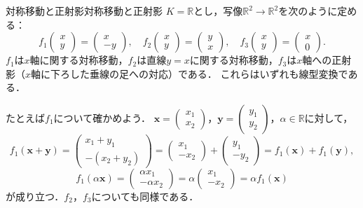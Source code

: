 \begin{example}{対称移動と正射影}{対称移動と正射影}
  $K = \mathbb{R}$とし，写像$\mathbb{R}^2 \to \mathbb{R}^2$を次のように定める：
  \[
    f_1 \begin{pmatrix} x \\ y \end{pmatrix} = \begin{pmatrix} x \\ -y \end{pmatrix}, \quad
    f_2 \begin{pmatrix} x \\ y \end{pmatrix} = \begin{pmatrix} y \\ x \end{pmatrix}, \quad
    f_3 \begin{pmatrix} x \\ y \end{pmatrix} = \begin{pmatrix} x \\ 0 \end{pmatrix}.
  \]
  $f_1$は$x$軸に関する対称移動，$f_2$は直線$y = x$に関する対称移動，$f_3$は$x$軸への正射影（$x$軸に下ろした垂線の足への対応）である．
  これらはいずれも線型変換である．

  たとえば$f_1$について確かめよう．
  $\bm{x} = \begin{pmatrix} x_1 \\ x_2 \end{pmatrix}$，$\bm{y} = \begin{pmatrix} y_1 \\ y_2 \end{pmatrix}$，$\alpha \in \mathbb{R}$に対して，
  \[
    f_1(\bm{x} + \bm{y})
    = \begin{pmatrix} x_1 + y_1 \\ -(x_2 + y_2) \end{pmatrix}
    = \begin{pmatrix} x_1 \\ -x_2 \end{pmatrix} + \begin{pmatrix} y_1 \\ -y_2 \end{pmatrix}
    = f_1(\bm{x}) + f_1(\bm{y}),
  \]
  \[
    f_1(\alpha\bm{x})
    = \begin{pmatrix} \alpha x_1 \\ -\alpha x_2 \end{pmatrix}
    = \alpha \begin{pmatrix} x_1 \\ -x_2 \end{pmatrix}
    = \alpha f_1(\bm{x})
  \]
  が成り立つ．$f_2$，$f_3$についても同様である．
\end{example}

